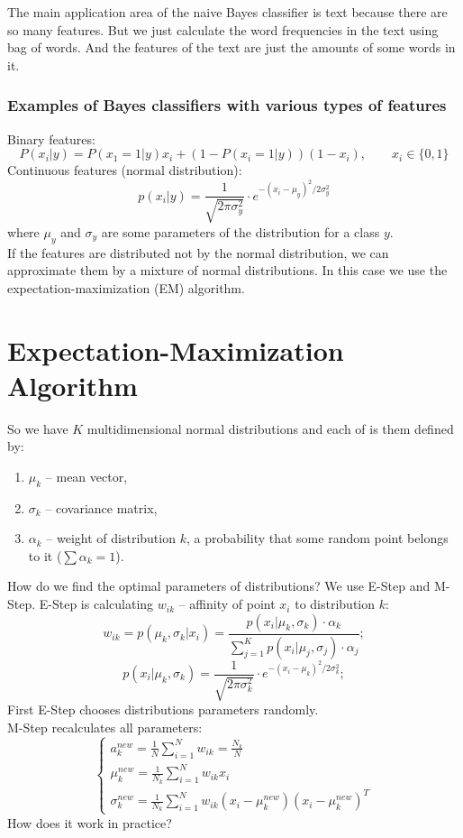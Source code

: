 The main application area of the naive Bayes classifier is text because there are so many features. But we just calculate the word frequencies in the text using bag of words. And the features of the text are just the amounts of some words in it.

\subsubsection*{Examples of Bayes classifiers with various types of features}

Binary features:
$$P(x_i|y)=P(x_1=1|y)x_i+(1-P(x_i=1|y))(1-x_i),\qquad x_i\in\{0,1\}$$
Continuous features (normal distribution):
$$p(x_i|y)=\frac{1}{\sqrt{2\pi\sigma_y^2}}\cdot e^{-(x_i-\mu_y)^2/2\sigma_y^2}$$
where $\mu_y$ and $\sigma_y$ are some parameters of the distribution for a class $y$. \\
If the features are distributed not by the normal distribution, we can approximate them by a mixture of normal distributions. In this case we use the expectation-maximization (EM) algorithm.

\section{Expectation-Maximization Algorithm}

So we have $K$ multidimensional normal distributions and each of is them defined by:
\begin{enumerate}[label=$\bullet$]
	\item $\mu_k$ -- mean vector,
	\item $\sigma_k$ -- covariance matrix,
	\item $\alpha_k$ -- weight of distribution $k$, a probability that some random point belongs to it ($\sum\alpha_k=1$).
\end{enumerate}
How do we find the optimal parameters of distributions? We use E-Step and M-Step. E-Step is calculating $w_{ik}$ -- affinity of point $x_i$ to distribution $k$:
$$w_{ik} = p(\mu_k,\sigma_k|x_i)=\frac{p(x_i|\mu_k,\sigma_k)\cdot\alpha_k}{\sum\limits_{j=1}^{K}p(x_i|\mu_j,\sigma_j)\cdot\alpha_j};$$
$$p(x_i|\mu_k, \sigma_k)=\frac{1}{\sqrt{2\pi\sigma_k^2}}\cdot e^{-(x_i-\mu_k)^2/2\sigma_k^2};$$
First E-Step chooses distributions parameters randomly.\\
M-Step recalculates all parameters:
$$\begin{cases}
	a_k^{new}=\frac{1}{N}\sum\limits_{i=1}^{N}w_{ik}=\frac{N_k}{N} \\
	\mu_k^{new}=\frac{1}{N_k}\sum\limits_{i=1}^{N}w_{ik}x_i \\
	\sigma_k^{new}=\frac{1}{N_k}\sum\limits_{i=1}^{N}w_{ik}(x_i-\mu_k^{new})(x_i-\mu_k^{new})^T
\end{cases}$$
How does it work in practice?

